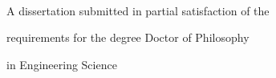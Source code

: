 \begin{titlepage}
	\centering
	{\large \publisher\par}
	~

	\vspace{28pt}
	{\Huge{}\selectfont\bfseries\booktitle\par}
	\vspace{24pt}

	{\Large{}\selectfont\authorname\par}
	\vspace{24pt}

	{\large A dissertation submitted in partial satisfaction of the\par\vspace*{.8ex}
	requirements for the degree Doctor of Philosophy\par\vspace*{.8ex}
	in Engineering Science}
	\vspace{42pt}

	{\begin{flushleft}%
		\begin{multicols}{2}
			\columnbreak
			{~\\
			~\\
			~}\par
		\end{multicols}
		\vspace{6pt}
		\begin{multicols}{2}
		~\\\columnbreak %
		\end{multicols}	
	\end{flushleft}}

	{\large\centering\editionyear{}}
\end{titlepage}

